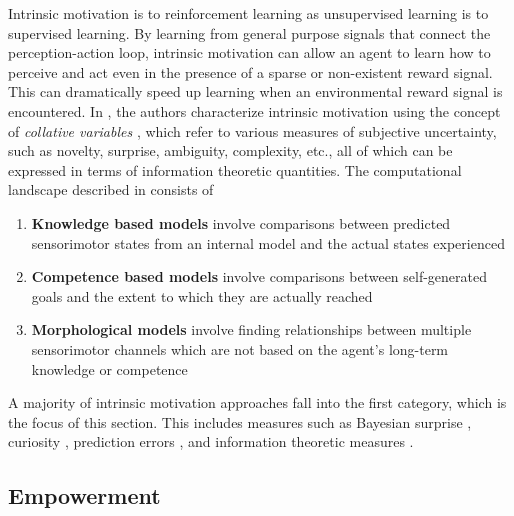 Intrinsic motivation is to reinforcement learning as unsupervised learning is to supervised learning. By learning from general purpose signals that connect the perception-action loop, intrinsic motivation can allow an agent to learn how to perceive and act even in the presence of a sparse or non-existent reward signal. This can dramatically speed up learning when an environmental reward signal is encountered. In \cite{oudeyer2008can}, the authors characterize intrinsic motivation using the concept of \textit{collative variables} \cite{berlyne1965structure}, which refer to various measures of subjective uncertainty, such as novelty, surprise, ambiguity, complexity, etc., all of which can be expressed in terms of information theoretic quantities. The computational landscape described in \cite{oudeyer2008can} consists of
\begin{enumerate}
	\item \textbf{Knowledge based models} involve comparisons between predicted sensorimotor states from an internal model and the actual states experienced
	\item \textbf{Competence based models} involve comparisons between self-generated goals and the extent to which they are actually reached
	\item \textbf{Morphological models} involve finding relationships between multiple sensorimotor channels which are not based on the agent's long-term knowledge or competence
\end{enumerate}
A majority of intrinsic motivation approaches fall into the first category, which is the focus of this section. This includes measures such as Bayesian surprise \cite{itti2006bayesian}, curiosity \cite{schmidhuber2010formal}, prediction errors \cite{nelson2005finding, barto2004intrinsically}, and information theoretic measures \cite{klyubin2005empowerment, little2013learning, wissner2013causal}. 

\subsection{Empowerment}

